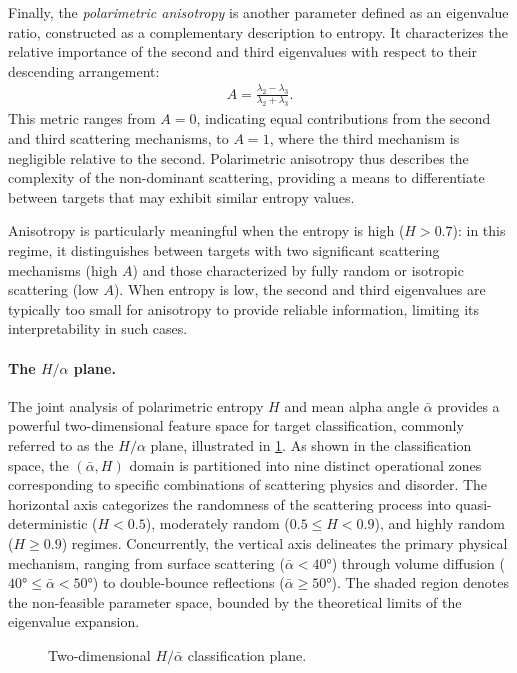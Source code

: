Finally, the \emph{polarimetric anisotropy} is another parameter defined as an eigenvalue ratio, constructed as a complementary description to entropy.
It characterizes the relative importance of the second and third eigenvalues with respect to their descending arrangement:
\begin{align}
    A = \frac{\lambda_2 - \lambda_3}{\lambda_2 + \lambda_3}.
\end{align}
This metric ranges from $A=0$, indicating equal contributions from the second and third scattering mechanisms, to $A=1$, where the third mechanism is negligible relative to the second.
Polarimetric anisotropy thus describes the complexity of the non-dominant scattering, providing a means to differentiate between targets that may exhibit similar entropy values.

Anisotropy is particularly meaningful when the entropy is high ($H > 0.7$): in this regime, it distinguishes between targets with two significant scattering mechanisms (high $A$) and those characterized by fully random or isotropic scattering (low $A$).
When entropy is low, the second and third eigenvalues are typically too small for anisotropy to provide reliable information, limiting its interpretability in such cases.

\paragraph{The $H/\alpha$ plane.}
The joint analysis of polarimetric entropy $H$ and mean alpha angle $\bar{\alpha}$ provides a powerful two-dimensional feature space for target classification, commonly referred to as the $H/\alpha$ plane, illustrated in \cref{fig:h-alpha-plane}.
As shown in the classification space, the $(\bar{\alpha}, H)$ domain is partitioned into nine distinct operational zones corresponding to specific combinations of scattering physics and disorder.
The horizontal axis categorizes the randomness of the scattering process into quasi-deterministic ($H < 0.5$), moderately random ($0.5 \le H < 0.9$), and highly random ($H \ge 0.9$) regimes.
Concurrently, the vertical axis delineates the primary physical mechanism, ranging from surface scattering ($\bar{\alpha} < \ang{40}$) through volume diffusion ($\ang{40} \le \bar{\alpha} < \ang{50}$) to double-bounce reflections ($\bar{\alpha} \ge \ang{50}$).
The shaded region denotes the non-feasible parameter space, bounded by the theoretical limits of the eigenvalue expansion.

\begin{figure}[htbp]
    \centering
    
    \caption{Two-dimensional $H/\bar{\alpha}$ classification plane.}
    \label{fig:h-alpha-plane}
\end{figure}


